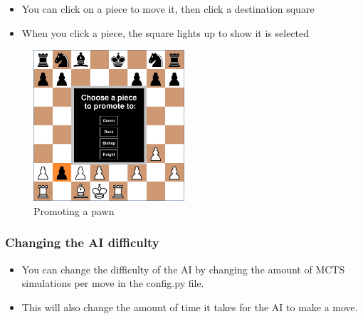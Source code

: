 \documentclass{article}
\newcommand\blankpage{%
    \null
    \thispagestyle{empty}%
    \addtocounter{page}{-1}%
    \newpage}
\begin{document}
\begin{itemize}
    \item You can click on a piece to move it, then click a destination square
    \item When you click a piece, the square lights up to show it is selected 
\end{itemize}

\begin{figure}[H]
    \centering
    \includegraphics[width=0.5\textwidth]{img/chessboard-promotion.png}
    \caption{Promoting a pawn}
\end{figure}

\subsubsection{Changing the AI difficulty}

\begin{itemize}
    \item You can change the difficulty of the AI by changing the amount of MCTS simulations per move in the config.py file.
    \item This will also change the amount of time it takes for the AI to make a move.
\end{itemize}




\afterpage{\blankpage}
\end{document}
